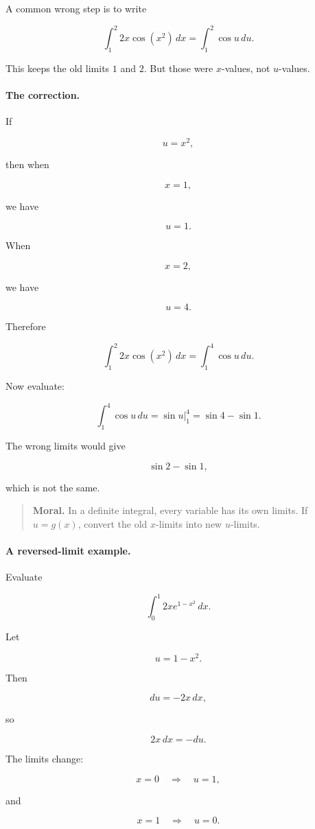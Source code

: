 A common wrong step is to write

\[
\int_1^2 2x\cos(x^2)\,dx
=
\int_1^2 \cos u\,du.
\]

This keeps the old limits \(1\) and \(2\).  But those were \(x\)-values, not \(u\)-values.

\paragraph{The correction.}
If

\[
u=x^2,
\]

then when

\[
x=1,
\]

we have

\[
u=1.
\]

When

\[
x=2,
\]

we have

\[
u=4.
\]

Therefore

\[
\int_1^2 2x\cos(x^2)\,dx
=
\int_1^4 \cos u\,du.
\]

Now evaluate:

\[
\int_1^4 \cos u\,du
=
\sin u\Big|_1^4
=
\boxed{\sin4-\sin1}.
\]

The wrong limits would give

\[
\sin2-\sin1,
\]

which is not the same.

\begin{quote}
\textbf{Moral.}
In a definite integral, every variable has its own limits.  If \(u=g(x)\), convert the
old \(x\)-limits into new \(u\)-limits.
\end{quote}

\paragraph{A reversed-limit example.}
Evaluate

\[
\int_0^1 2x e^{1-x^2}\,dx.
\]

Let

\[
u=1-x^2.
\]

Then

\[
du=-2x\,dx,
\]

so

\[
2x\,dx=-du.
\]

The limits change:

\[
x=0 \quad\Longrightarrow\quad u=1,
\]

and

\[
x=1 \quad\Longrightarrow\quad u=0.
\]

